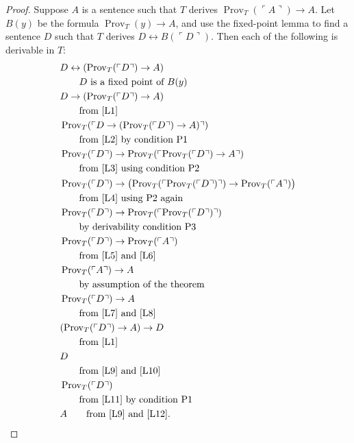 \documentclass[UTF8,11pt]{ctexart}
\theoremstyle{definition}
\begin{document}
\begin{proof}
Suppose $A$ is a sentence such that $T$ derives $\operatorname{Prov}_T(\ulcorner A\urcorner)\to A$. Let $B(y)$ be the formula $\operatorname{Prov}_T(y)\to A$, and use the fixed-point lemma to find a sentence $D$ such that $T$ derives $D\leftrightarrow B(\ulcorner D\urcorner)$. Then each of the following is derivable in $T$:
\begin{align}
&D\leftrightarrow(\operatorname{Prov}_T(\ulcorner D\urcorner)\to A)\label{L1}\\
&\qquad\text{$D$ is a fixed point of $B(y)$}\notag\\
&D\to(\operatorname{Prov}_T(\ulcorner D\urcorner)\to A)\label{L2}\\
&\qquad\text{from \eqref{L1}}\notag\\
&\operatorname{Prov}_T(\ulcorner D\to(\operatorname{Prov}_T(\ulcorner D\urcorner)\to A)\urcorner)\label{L3}\\
&\qquad\text{from \eqref{L2} by condition P1}\notag\\
&\operatorname{Prov}_T(\ulcorner D\urcorner)\to\operatorname{Prov}_T(\ulcorner\operatorname{Prov}_T(\ulcorner D\urcorner)\to A\urcorner)\label{L4}\\
&\qquad\text{from \eqref{L3} using condition P2}\notag\\
&\operatorname{Prov}_T(\ulcorner D\urcorner)\to\bigl(\operatorname{Prov}_T(\ulcorner\operatorname{Prov}_T(\ulcorner D\urcorner)\urcorner)\to\operatorname{Prov}_T(\ulcorner A\urcorner)\bigr)\label{L5}\\
&\qquad\text{from \eqref{L4} using P2 again}\notag\\
&\operatorname{Prov}_T(\ulcorner D\urcorner)\to\operatorname{Prov}_T(\ulcorner\operatorname{Prov}_T(\ulcorner D\urcorner)\urcorner)\label{L6}\\
&\qquad\text{by derivability condition P3}\notag\\
&\operatorname{Prov}_T(\ulcorner D\urcorner)\to\operatorname{Prov}_T(\ulcorner A\urcorner)\label{L7}\\
&\qquad\text{from \eqref{L5} and \eqref{L6}}\notag\\
&\operatorname{Prov}_T(\ulcorner A\urcorner)\to A\label{L8}\\
&\qquad\text{by assumption of the theorem}\notag\\
&\operatorname{Prov}_T(\ulcorner D\urcorner)\to A\label{L9}\\
&\qquad\text{from \eqref{L7} and \eqref{L8}}\notag\\
&(\operatorname{Prov}_T(\ulcorner D\urcorner)\to A)\to D\label{L10}\\
&\qquad\text{from \eqref{L1}}\notag\\
&D\label{L11}\\
&\qquad\text{from \eqref{L9} and \eqref{L10}}\notag\\
&\operatorname{Prov}_T(\ulcorner D\urcorner)\label{L12}\\
&\qquad\text{from \eqref{L11} by condition P1}\notag\\
&A\qquad\text{from \eqref{L9} and \eqref{L12}.}\notag
\end{align}
\end{proof}
\end{document}
